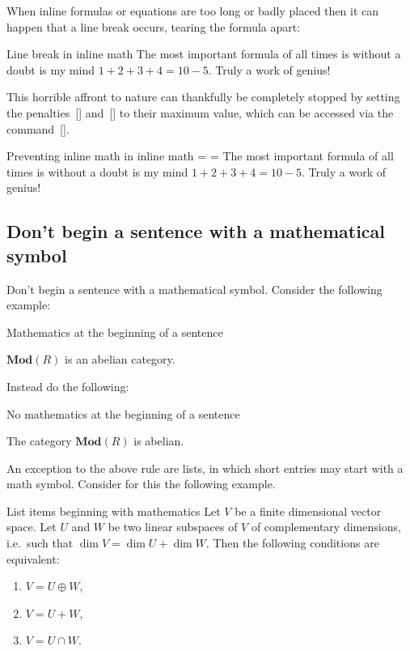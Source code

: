 When inline formulas or equations are too long or badly placed then it can happen that a line break occurs, tearing the formula apart:
\begin{showlatex}[before lower = {\binoppenalty=100}, after lower = {\binoppenalty = \maxdimen}]{Line break in inline math}
The most important formula of all times is without a doubt is my mind $1 + 2 + 3 + 4 = 10 - 5$.
Truly a work of genius!
\end{showlatex}
This horrible affront to nature can thankfully be completely stopped by setting the penalties~[\comname] and~[\comname] to their maximum value, which can be accessed via the command~[\comname].
\begin{showlatex}{Preventing inline math in inline math}
\binoppenalty = \maxdimen
\relpenalty = \maxdimen
The most important formula of all times is without a doubt is my mind $1 + 2 + 3 + 4 = 10 - 5$.
Truly a work of genius!
\end{showlatex}



\subsection{Don’t begin a sentence with a mathematical symbol}

Don’t begin a sentence with a mathematical symbol.
Consider the following example:
\begin{showlatex}{Mathematics at the beginning of a sentence}
\begin{theorem}
  $\mathbf{Mod}(R)$ is an abelian category.
\end{theorem}
\end{showlatex}
Instead do the following:
\begin{showlatex}{No mathematics at the beginning of a sentence}
\begin{theorem}
  The category $\mathbf{Mod}(R)$ is abelian.
\end{theorem}
\end{showlatex}

An exception to the above rule are lists, in which short entries may start with a math symbol.
Consider for this the following example.
\begin{showlatex}{List items beginning with mathematics}
Let $V$ be a finite dimensional vector space.
Let $U$ and $W$ be two linear subspaces of $V$ of complementary dimensions, i.e.\ such that $\dim V = \dim U + \dim W$.
Then the following conditions are equivalent:
\begin{enumerate}[label = \roman*)]
  \item
    $V = U \oplus W$,
  \item
    $V = U + W$,
  \item
    $V = U \cap W$.
\end{enumerate}
\end{showlatex}



